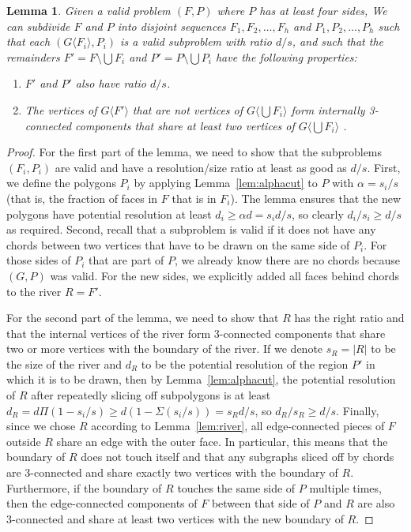 \documentclass[11pt]{article}
\newcommand {\fsg} [1] {\ensuremath {G \langle #1 \rangle}}
\newtheorem {lemma} {Lemma}
\begin{document}
    \begin {lemma} \label {lem:divide}
      Given a valid problem $(F, P)$ where $P$ has at least four sides,
      We can subdivide $F$ and $P$ into disjoint sequences $F_1, F_2, \ldots, F_h$
      and $P_1, P_2, \ldots, P_h$ such that each $(\fsg {F_i}, P_i)$ is a valid
      subproblem with ratio $d/s$, and such that the remainders
      $F' = F \setminus \bigcup F_i$ and $P' = P \setminus \bigcup P_i$ have
      the following properties:
      \begin {enumerate}
        \item $F'$ and $P'$ also have ratio $d/s$.
        \item The vertices of $\fsg {F'}$ that are not vertices of
        $\fsg {\bigcup F_i}$ form internally 3-connected components that
        share at least two vertices of        $\fsg {\bigcup F_i}$ .
      \end {enumerate}
    \end {lemma}

    \begin {proof}
      For the first part of the lemma, we need to show that the subproblems
      $(F_i, P_i)$ are valid and have a resolution/size ratio at least as
      good as $d/s$.
      First, we define the polygons $P_i$ by applying Lemma~\ref {lem:alphacut}
      to $P$ with $\alpha = s_i/s$ (that is, the fraction of
      faces in $F$ that is in $F_i$). The lemma ensures that the new polygons
      have potential resolution at least $d_i \geq \alpha d = s_i d/s$, so clearly
      $d_i / s_i \geq d / s$ as required.
      Second, recall that a subproblem is valid if it does not have any chords
      between two vertices that have to be drawn on the same side of $P_i$.
      For those sides of $P_i$ that are part of $P$, we already know there are
      no chords because $(G, P)$ was valid. For the new sides, we explicitly
      added all faces behind chords to the river $R = F'$.

      For the second part of the lemma, we need to show that $R$
      has the right ratio and that the internal vertices of the river form
      3-connected components that share two or more vertices with the boundary
      of the river.
      If we denote $s_R = |R|$ to be the size of the river and $d_R$ to be the
      potential resolution of the region $P'$ in which it is to be drawn, then
      by Lemma~\ref {lem:alphacut}, the potential resolution of $R$ after
      repeatedly slicing off subpolygons is at least $d_R = d\Pi (1-s_i/s)
      \geq d(1-\Sigma(s_i/s)) = s_R d / s$, so $d_R / s_R \geq d / s$.
      Finally, since we chose $R$ according to Lemma~\ref {lem:river}, all
      edge-connected pieces of $F$ outside $R$ share an edge with the outer
      face. In particular, this means that the boundary of $R$ does not touch
      itself and that any subgraphs sliced off by chords are 3-connected and
      share exactly two vertices with the boundary of $R$.
      Furthermore, if the boundary of $R$ touches the same side of $P$ multiple
      times, then the edge-connected components of $F$ between that side of $P$
      and $R$ are also 3-connected and share at least two vertices with the new
      boundary of $R$.
    \end {proof}
\end{document}

